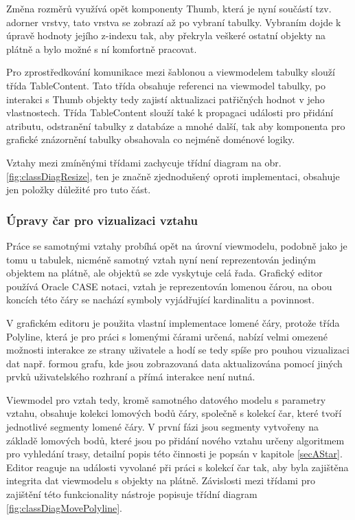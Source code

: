 \documentclass[czech,bachelor,public,dept460,male,oneside]{diploma}
\begin{document}
		Změna rozměrů využívá opět komponenty Thumb, která je nyní součástí tzv. adorner vrstvy, tato vrstva se zobrazí až po vybraní tabulky. Vybraním dojde k úpravě hodnoty jejího z-indexu tak, aby překryla veškeré ostatní objekty na plátně a bylo možné s ní komfortně pracovat. 
		
		Pro zprostředkování komunikace mezi šablonou a viewmodelem tabulky slouží třída TableContent. Tato třída obsahuje referenci na viewmodel tabulky, po interakci s Thumb objekty tedy zajistí aktualizaci patřičných hodnot v jeho vlastnostech. Třída TableContent slouží také k propagaci události pro přidání atributu, odstranění tabulky z databáze a mnohé další, tak aby komponenta pro grafické znázornění tabulky obsahovala co nejméně doménové logiky.
		
		Vztahy mezi zmíněnými třídami zachycuje třídní diagram na obr. \ref{fig:classDiagResize}, ten je značně zjednodušený oproti implementaci, obsahuje jen položky důležité pro tuto část.
		
		\subsubsection{Úpravy čar pro vizualizaci vztahu}
		Práce se samotnými vztahy probíhá opět na úrovní viewmodelu, podobně jako je tomu u tabulek, nicméně samotný vztah nyní není reprezentován jediným objektem na plátně, ale objektů se zde vyskytuje celá řada. Grafický editor používá Oracle CASE notaci, vztah je reprezentován lomenou čárou, na obou koncích této čáry se nachází symboly vyjádřující kardinalitu a povinnost. 
		
		V grafickém editoru je použita vlastní implementace lomené čáry, protože třída Polyline, která je pro práci s lomenými čárami určená, nabízí velmi omezené možnosti interakce ze strany uživatele a hodí se tedy spíše pro pouhou vizualizaci dat např. formou grafu, kde jsou zobrazovaná data aktualizována pomocí jiných prvků uživatelského rozhraní a přímá interakce není nutná.
		
		Viewmodel pro vztah tedy, kromě samotného datového modelu s parametry vztahu, obsahuje kolekci lomových bodů čáry, společně s kolekcí čar, které tvoří jednotlivé segmenty lomené čáry. V první fázi jsou segmenty vytvořeny na základě lomových bodů, které jsou po přidání nového vztahu určeny algoritmem pro vyhledání trasy, detailní popis této činnosti je popsán v kapitole \ref{secAStar}. Editor reaguje na události vyvolané při práci s kolekcí čar tak, aby byla zajištěna integrita dat viewmodelu s objekty na plátně. Závislosti mezi třídami pro zajištění této funkcionality nástroje popisuje třídní diagram \ref{fig:classDiagMovePolyline}.
		
\end{document}
